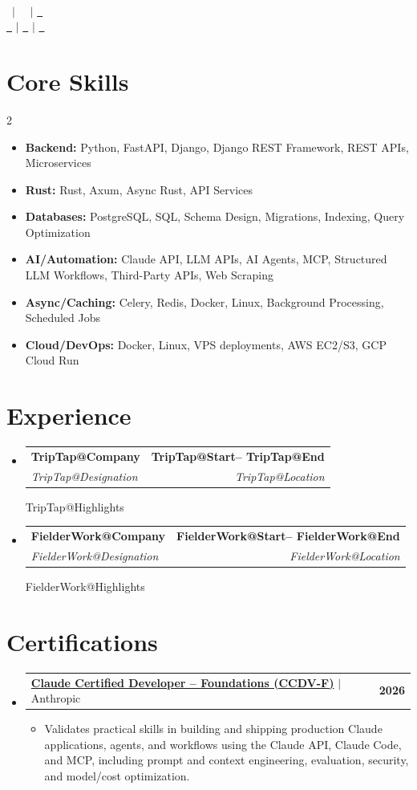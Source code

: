 \documentclass[letterpaper,11pt]{article}
\makeatletter
\newcommand{\resumeItem}[1]{
  \item{{#1 \vspace{0pt}}}
}
\newcommand{\resumeSubheading}[4]{
  \vspace{-1pt}\item
    \begin{tabular*}{1.0\textwidth}[t]{l@{\extracolsep{\fill}}r}
      \textbf{#1} & \textbf{#2} \\
      \textit{#3} & \textit{#4} \\
    \end{tabular*}\vspace{-5pt}
}
\newcommand{\resumeProjectHeading}[2]{
    \item
    \begin{tabular*}{1.0\textwidth}{l@{\extracolsep{\fill}}r}
      #1 & \textbf{#2}\\
    \end{tabular*}\vspace{-5pt}
}
\newcommand{\resumeSubHeadingListStart}{\begin{itemize}[leftmargin=0.0in, label={}]}
\newcommand{\resumeSubHeadingListEnd}{\end{itemize}}
\newcommand{\resumeItemListStart}{\begin{itemize}[leftmargin=0.16in]}
\newcommand{\resumeItemListEnd}{\end{itemize}\vspace{-1pt}}
\newcommand{\renderExp}[1]{
\resumeSubheading
      {\csname #1@Company\endcsname}{\csname #1@Start\endcsname -- \csname #1@End\endcsname}
      {\csname #1@Designation\endcsname}{\csname #1@Location\endcsname}
      \csname #1@Highlights\endcsname
}
\def\titlesection{
\begin{center}
    {\Huge \scshape \firstname\ \lastname} \\ \vspace{2pt}
    \small
    \location\ $|$
    \raisebox{-0.1\height}\faPhone\ \phone\ $|$
    \href{mailto:\email}{\raisebox{-0.2\height}\faEnvelope\ \underline{\email}} \\ \vspace{2pt}
    \href{https://\linkedin}{\raisebox{-0.2\height}\faLinkedin\ \underline{\linkedin}} $|$
    \href{https://\github}{\raisebox{-0.2\height}\faGithub\ \underline{\github}} $|$
    \href{https://\website}{\raisebox{-0.2\height}\faGlobe\ \underline{\website}}
    \vspace{-8pt}
\end{center}
}
\makeatother
\begin{document}
\titlesection
\profileSummary

\section{Core Skills}
\begin{multicols}{2}
    \resumeSubHeadingListStart
        \item{\textbf{Backend:} Python, FastAPI, Django, Django REST Framework, REST APIs, Microservices}
        \item{\textbf{Rust:} Rust, Axum, Async Rust, API Services}
        \item{\textbf{Databases:} PostgreSQL, SQL, Schema Design, Migrations, Indexing, Query Optimization}
    \resumeSubHeadingListEnd
\columnbreak
    \resumeSubHeadingListStart
        \item{\textbf{AI/Automation:} Claude API, LLM APIs, AI Agents, MCP, Structured LLM Workflows, Third-Party APIs, Web Scraping}
        \item{\textbf{Async/Caching:} Celery, Redis, Docker, Linux, Background Processing, Scheduled Jobs}
        \item{\textbf{Cloud/DevOps:} Docker, Linux, VPS deployments, AWS EC2/S3, GCP Cloud Run}
    \resumeSubHeadingListEnd
\end{multicols}

\section{Experience}
    \vspace{5pt}
    \resumeSubHeadingListStart
        \renderExp{TripTap}
        \vspace{5pt}
        \renderExp{FielderWork}
    \resumeSubHeadingListEnd

\section{Certifications}
  \resumeSubHeadingListStart
    \resumeProjectHeading
      {\href{https://www.credly.com/badges/01073263-7e89-47e6-aa64-59fba6c649f9/public_url}{\textbf{Claude Certified Developer -- Foundations (CCDV-F)}} $|$ Anthropic}
      {2026}
      \resumeItemListStart
        \resumeItem{Validates practical skills in building and shipping production Claude applications, agents, and workflows using the Claude API, Claude Code, and MCP, including prompt and context engineering, evaluation, security, and model/cost optimization.}
      \resumeItemListEnd
  \resumeSubHeadingListEnd
\end{document}
